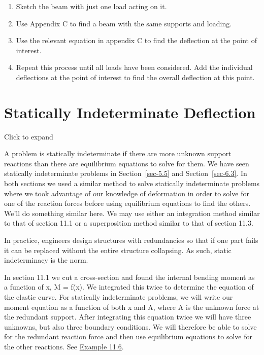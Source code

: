 \documentclass[
  letterpaper,
  DIV=11,
  numbers=noendperiod]{scrreprt}
\theoremstyle{definition}
\theoremstyle{remark}
\begin{document}
\begin{tcolorbox}[enhanced jigsaw, leftrule=.75mm, colbacktitle=quarto-callout-warning-color!10!white, breakable, opacityback=0, colback=white, titlerule=0mm, toprule=.15mm, colframe=quarto-callout-warning-color-frame, coltitle=black, title={Step-by-step: Deflection by Superposition}, toptitle=1mm, bottomrule=.15mm, rightrule=.15mm, left=2mm, arc=.35mm, opacitybacktitle=0.6, bottomtitle=1mm]

\begin{enumerate}
\def\labelenumi{\arabic{enumi}.}
\item
  Sketch the beam with just one load acting on it.
\item
  Use Appendix C to find a beam with the same supports and loading.
\item
  Use the relevant equation in appendix C to find the deflection at the
  point of interest.
\item
  Repeat this process until all loads have been considered. Add the
  individual deflections at the point of interest to find the overall
  deflection at this point.
\end{enumerate}

\end{tcolorbox}

\section{Statically Indeterminate Deflection}\label{sec-11.4}

Click to expand

A problem is statically indeterminate if there are more unknown support
reactions than there are equilibrium equations to solve for them. We
have seen statically indeterminate problems in Section~\ref{sec-5.5} and
Section~\ref{sec-6.3}. In both sections we used a similar method to
solve statically indeterminate problems where we took advantage of our
knowledge of deformation in order to solve for one of the reaction
forces before using equilibrium equations to find the others. We'll do
something similar here. We may use either an integration method similar
to that of section 11.1 or a superposition method similar to that of
section 11.3.

In practice, engineers design structures with redundancies so that if
one part fails it can be replaced without the entire structure
collapsing. As such, static indeterminacy is the norm.

In section 11.1 we cut a cross-section and found the internal bending
moment as a function of x, M = f(x). We integrated this twice to
determine the equation of the elastic curve. For statically
indeterminate problems, we will write our moment equation as a function
of both x and A, where A is the unknown force at the redundant support.
After integrating this equation twice we will have three unknowns, but
also three boundary conditions. We will therefore be able to solve for
the redundant reaction force and then use equilibrium equations to solve
for the other reactions. See \hyperref[example-11.6]{Example 11.6}.
\end{document}
